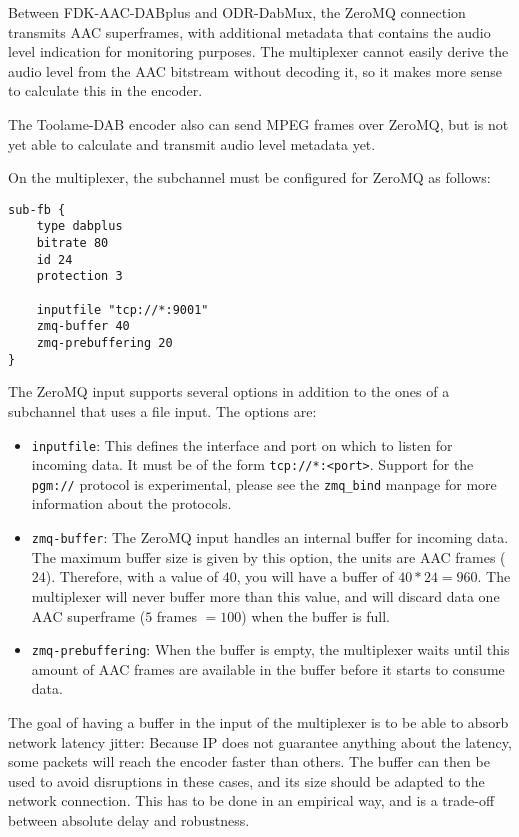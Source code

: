 Between FDK-AAC-DABplus and ODR-DabMux, the ZeroMQ connection transmits AAC
superframes, with additional metadata that contains the audio level indication
for monitoring purposes. The multiplexer cannot easily derive the audio level
from the AAC bitstream without decoding it, so it makes more sense to calculate
this in the encoder.

The Toolame-DAB encoder also can send MPEG frames over ZeroMQ, but is not yet
able to calculate and transmit audio level metadata yet.

On the multiplexer, the subchannel must be configured for ZeroMQ as follows:
\begin{lstlisting}
sub-fb {
    type dabplus
    bitrate 80
    id 24
    protection 3

    inputfile "tcp://*:9001"
    zmq-buffer 40
    zmq-prebuffering 20
}
\end{lstlisting}

The ZeroMQ input supports several options in addition to the ones of a
subchannel that uses a file input. The options are:

\begin{itemize}
    \item \texttt{inputfile}: This defines the interface and port on which to
        listen for incoming data. It must be of the form
        \texttt{tcp://*:<port>}. Support for the \texttt{pgm://} protocol is
        experimental, please see the \texttt{zmq\_bind} manpage for more
        information about the protocols.
    \item \texttt{zmq-buffer}: The ZeroMQ input handles an internal buffer for
        incoming data. The maximum buffer size is given by this option, the
        units are AAC frames ($24$\ms). Therefore, with a value of $40$, you
        will have a buffer of $40 * 24 = 960$\ms. The multiplexer will never
        buffer more than this value, and will discard data one AAC superframe
        ($5$ frames $= 100$\ms) when the buffer is full.
    \item \texttt{zmq-prebuffering}: When the buffer is empty, the multiplexer
        waits until this amount of AAC frames are available in the buffer
        before it starts to consume data.
\end{itemize}

The goal of having a buffer in the input of the multiplexer is to be able to
absorb network latency jitter: Because IP does not guarantee anything about the
latency, some packets will reach the encoder faster than others. The buffer can
then be used to avoid disruptions in these cases, and its size should be
adapted to the network connection. This has to be done in an empirical way, and
is a trade-off between absolute delay and robustness.

